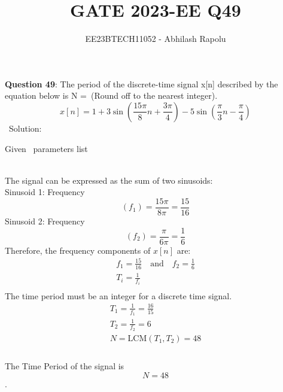 \documentclass[journal,12pt,twocolumn]{IEEEtran}
\title{GATE 2023-EE Q49}
\author{EE23BTECH11052 - Abhilash Rapolu 
}
\begin{document}
\maketitle
\newpage
\bigskip
\textbf{Question 49}: The period of the discrete-time signal x[n] described by the equation below is N =\ (Round off to the nearest integer).
$$x[n] = 1 + 3\sin\left(\frac{15\pi}{8}n + \frac{3\pi}{4}\right) - 5\sin\left(\frac{\pi}{3}n - \frac{\pi}{4}\right)$$
\ Solution:
\begin{table}[htbp] \small
\centering

\caption{Given \, parameters list}
\end{table}\\
The signal can be expressed as the sum of two sinusoids:\\
Sinusoid 1: Frequency $$(f_1) = \frac{15\pi}{8\pi} = \frac{15}{16}$$
Sinusoid 2: Frequency $$(f_2) = \frac{\pi}{6\pi} = \frac{1}{6}$$
Therefore, the frequency components of $x[n]$ are:
\begin{align}
f_1 = \frac{15}{16} \quad \text{and} \quad f_2 = \frac{1}{6}\\
T_i = \frac{1}{f_i}\\
\end{align}
The time period must be an integer for a discrete time signal.\\
\begin{align}
T_1 = \frac{1}{f_1} = \frac{16}{15} \\
T_2 = \frac{1}{f_2} = 6 \\
N = \text{LCM}(T_1, T_2) = 48\\
\end{align}
\\The Time Period of the signal is $$N =48$$.
\end{document}
